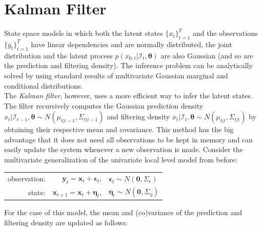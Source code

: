 \documentclass[11pt, oneside]{scrreprt}   	%
\begin{document}
\section{Kalman Filter}
State space models in which both the latent states $\{x_t\}_{t=1}^T$ and the observations $\{y_t\}_{t=1}^T$ have linear dependencies and are normally distributed, the joint distribution and the latent process $p(x_{0:t} | \mathcal{I}_t,\boldsymbol{\theta})$ are also Gaussian (and so are the prediction and filtering density). 
The inference problem can be analytically solved by using standard results of multivariate Gaussian marginal and conditional distributions.\\

The \textit{Kalman filter}, however, uses a more efficient way to infer the latent states. 
The filter recursively computes the Gaussian prediction density $x_{t} | \mathcal{I}_{t-1}, \boldsymbol{\theta} \sim N(\mu_{t | t-1}, \Sigma_{t | t-1})$ and filtering density $x_{t} | \mathcal{I}_{t}, \boldsymbol{\theta} \sim N(\mu_{t | t}, \Sigma_{t | t})$ by obtaining their respective mean and covariance. 
This method has the big advantage that it does not need all observations to be kept in memory and can easily update the system whenever a new observation is made.
Consider the multivariate generalization of the univariate local level model from before:
\bigskip
\begin{center}
\begin{tabular}{ r r l }
  observation: & $\boldsymbol{y}_t = \boldsymbol{x}_t + \boldsymbol{\epsilon}_t$, & $\boldsymbol{\epsilon}_t \sim N(\textbf{0}, \Sigma_{\epsilon})$ \\
  state: & $\boldsymbol{x}_{t+1} = \boldsymbol{x}_t + \boldsymbol{\eta}_t$, & $\boldsymbol{\eta}_t \sim N(\textbf{0}, \Sigma_{\eta})$ \\
\end{tabular}
\end{center}
\bigskip
For the case of this model, the mean and (co)variance of the prediction and filtering density are updated as follows:
\end{document}
